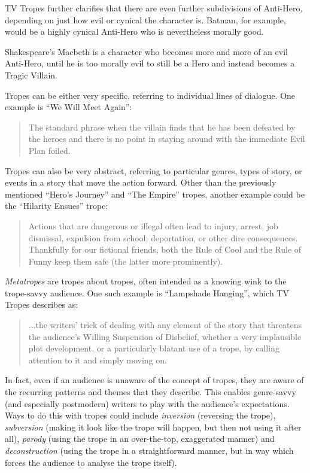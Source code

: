 TV Tropes further clarifies that there are even further subdivisions of
Anti-Hero, depending on just how evil or cynical the character is. Batman, for
example, would be a highly cynical Anti-Hero who is nevertheless morally good.

Shakespeare's Macbeth is a character who becomes more and more of an evil Anti-Hero, until he is too morally evil
to still be a Hero and instead becomes a Tragic Villain.

Tropes can be either very specific, referring to individual lines of dialogue.
One example is ``We Will Meet Again'':

\begin{quote}
The standard phrase when the villain finds that he has been defeated by the heroes and there is no point in staying around with the immediate Evil Plan foiled.
\end{quote}

Tropes can also be very abstract, referring to particular genres, types of
story, or events in a story that move the action forward. Other than the
previously mentioned ``Hero's Journey'' and ``The Empire'' tropes, another
example could be the ``Hilarity Ensues'' trope:

\begin{quote}
Actions that are dangerous or illegal often lead to injury, arrest, job dismissal, expulsion from school, deportation, or other dire consequences. Thankfully for our fictional friends, both the Rule of Cool and the Rule of Funny keep them safe (the latter more prominently).
\end{quote}

\emph{Metatropes} are tropes about tropes, often intended as a knowing wink to
the trope-savvy audience. One such example is ``Lampshade Hanging'', which TV
Tropes describes as:

\begin{quote}
...the writers' trick of dealing with any element of the story that threatens the audience's Willing Suspension of Disbelief, whether a very implausible plot development, or a particularly blatant use of a trope, by calling attention to it and simply moving on.
\end{quote}

In fact, even if an audience is unaware of the concept of tropes, they are aware
of the recurring patterns and themes that they describe. This enables
genre-savvy (and especially postmodern) writers to play with the audience's
expectations. Ways to do this with tropes could include \emph{inversion}
(reversing the trope),
\emph{subversion} (making it look like the trope will happen, but then not using
it after all), \emph{parody} (using the trope in an over-the-top, exaggerated
manner) and \emph{deconstruction} (using the trope in a straightforward manner,
but in way which forces the audience to analyse the trope itself).

